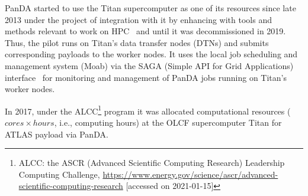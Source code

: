 PanDA started to use the Titan supercomputer as one of its resources since late 2013 under the project of integration with it by enhancing with tools and methods relevant to work on HPC~\cite{ref-titan-prodsys} and until it was decommissioned in 2019. Thus, the pilot runs on Titan's data transfer nodes (DTNs) and submits corresponding payloads to the worker nodes. It uses the local job scheduling and management system (Moab) via the SAGA (Simple API for Grid Applications) interface~\cite{ref-saga} for monitoring and management of PanDA jobs running on Titan's worker nodes.

In 2017, under the ALCC\footnote{ALCC: the ASCR (Advanced Scientific Computing Research) Leadership Computing Challenge, \url{https://www.energy.gov/science/ascr/advanced-scientific-computing-research} [accessed on 2021-01-15]} program it was allocated computational resources ($cores \times hours$, i.e., computing hours) at the OLCF supercomputer Titan for ATLAS payload via PanDA.
